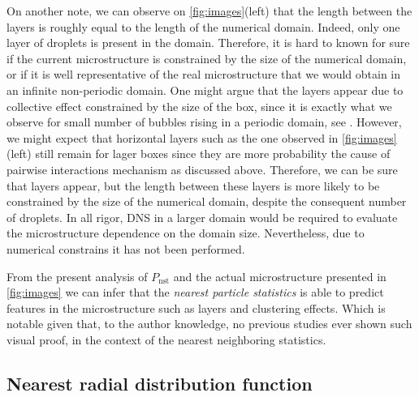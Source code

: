 On another note, we can observe on \ref{fig:images}(left) that the length between the layers is roughly equal to the length of the numerical domain. 
Indeed, only one layer of droplets is present in the domain. 
Therefore, it is hard to known for sure if the current microstructure is constrained by the size of the numerical domain, or if it is well representative of the real microstructure that we would obtain in an infinite non-periodic domain. 
One might argue that the layers appear due to collective effect constrained by the size of the box, since it is exactly what we observe for small number of bubbles rising in a periodic domain, see \citet{loisy2017}. 
However, we might expect that horizontal layers such as the one observed in \ref{fig:images} (left) still remain for lager boxes since they are more probability the cause of pairwise interactions mechanism as discussed above. 
Therefore, we can be sure that layers appear, but the length between these layers is more likely to be constrained by the size of the numerical domain, despite the consequent number of droplets. 
In all rigor, DNS in a larger domain would be required to evaluate the microstructure dependence on the domain size. 
Nevertheless, due to numerical constrains it has not been performed.  

From the present analysis of $P_\text{nst}$ and the actual microstructure presented in \ref{fig:images} we can infer that the \textit{nearest particle statistics} is able to predict features in the microstructure such as layers and clustering effects. 
Which is notable given that, to the author knowledge, no previous studies ever shown such visual proof, in the context of the nearest neighboring statistics. 


\subsection{Nearest radial distribution function }

